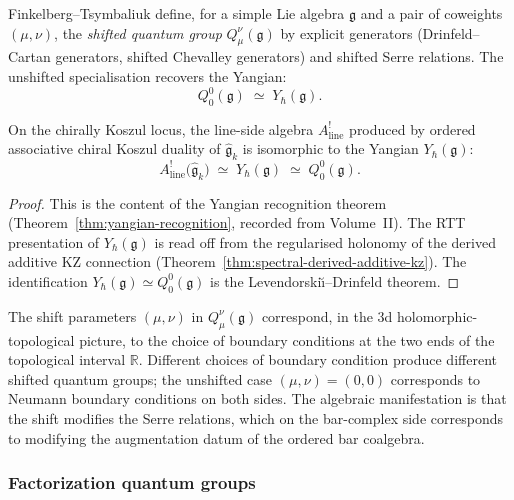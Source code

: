 Finkelberg--Tsymbaliuk define, for a simple Lie algebra $\mathfrak{g}$
and a pair of coweights $(\mu,\nu)$, the \emph{shifted quantum group}
$Q_\mu^\nu(\mathfrak{g})$ by explicit generators (Drinfeld--Cartan
generators, shifted Chevalley generators) and shifted Serre relations.
The unshifted specialisation recovers the Yangian:
\begin{equation}\label{eq:unshifted-yangian}
Q_0^0(\mathfrak{g})\;\simeq\; Y_\hbar(\mathfrak{g}).
\end{equation}

\begin{theorem}
\label{thm:unshifted-identification}
On the chirally Koszul locus, the line-side algebra $A^!_{\mathrm{line}}$
produced by ordered associative chiral Koszul duality of $\widehat{\mathfrak{g}}_k$
is isomorphic to the Yangian $Y_\hbar(\mathfrak{g})$:
\[
A^!_{\mathrm{line}}\bigl(\widehat{\mathfrak{g}}_k\bigr)
\;\simeq\;
Y_\hbar(\mathfrak{g})
\;\simeq\;
Q_0^0(\mathfrak{g}).
\]
\end{theorem}

\begin{proof}
This is the content of the Yangian recognition theorem
(Theorem~\ref*{thm:yangian-recognition}, recorded from Volume~II).
The RTT presentation of $Y_\hbar(\mathfrak{g})$ is read off from
the regularised holonomy of the derived additive KZ connection
(Theorem~\ref{thm:spectral-derived-additive-kz}). The identification
$Y_\hbar(\mathfrak{g})\simeq Q_0^0(\mathfrak{g})$ is the
Levendorski\u{\i}--Drinfeld theorem.
\end{proof}

\begin{remark}
\label{rem:shift-boundary-conditions}
The shift parameters $(\mu,\nu)$ in $Q_\mu^\nu(\mathfrak{g})$ correspond,
in the 3d holomorphic-topological picture, to the choice of boundary
conditions at the two ends of the topological interval $\mathbb{R}$.
Different choices of boundary condition produce different shifted
quantum groups; the unshifted case $(\mu,\nu)=(0,0)$ corresponds
to Neumann boundary conditions on both sides. The algebraic
manifestation is that the shift modifies the Serre relations,
which on the bar-complex side corresponds to modifying the
augmentation datum of the ordered bar coalgebra.
\end{remark}

\subsubsection*{Factorization quantum groups}

